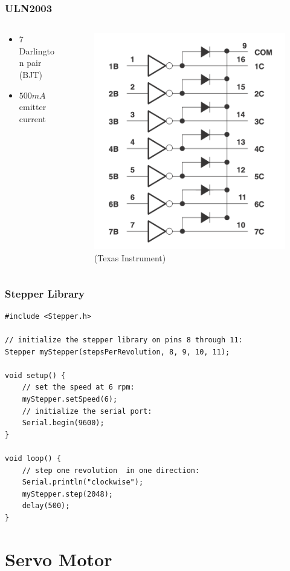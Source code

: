 \documentclass[compress, aspectratio=32]{beamer}
\begin{document}
\begin{frame}
    \frametitle{ULN2003}
    \begin{columns}
        \begin{column}{0.5\textwidth}
            \begin{itemize}
                \item 7 Darlington pair (BJT)
                \item $500mA$ emitter current
            \end{itemize}
        \end{column}
        \begin{column}{0.5\textwidth}
            \begin{figure}
                \centering
                \includegraphics[height=0.7\textheight]{uln2003.png}
                \caption*{(Texas Instrument)}
            \end{figure}
        \end{column}
    \end{columns}
\end{frame}

\begin{frame}[fragile]
    \frametitle{Stepper Library}
    \begin{lstlisting}
#include <Stepper.h>

// initialize the stepper library on pins 8 through 11:
Stepper myStepper(stepsPerRevolution, 8, 9, 10, 11);

void setup() {
    // set the speed at 6 rpm:
    myStepper.setSpeed(6);
    // initialize the serial port:
    Serial.begin(9600);
}

void loop() {
    // step one revolution  in one direction:
    Serial.println("clockwise");
    myStepper.step(2048);
    delay(500);
}
    \end{lstlisting}
\end{frame}

\section{Servo Motor}
\end{document}

